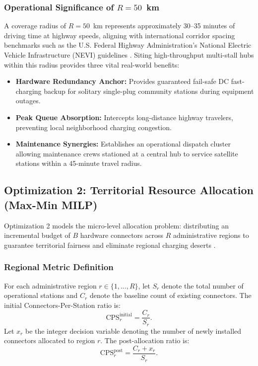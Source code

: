\documentclass[conference]{IEEEtran}
\begin{document}
\subsubsection{Operational Significance of $R = 50$~km}
A coverage radius of $R = 50$~km represents approximately 30--35 minutes of driving time at highway speeds, aligning with international corridor spacing benchmarks such as the U.S. Federal Highway Administration's National Electric Vehicle Infrastructure (NEVI) guidelines \cite{fhwa2022nevi}. Siting high-throughput multi-stall hubs within this radius provides three vital real-world benefits:
\begin{itemize}
    \item \textbf{Hardware Redundancy Anchor:} Provides guaranteed fail-safe DC fast-charging backup for solitary single-plug community stations during equipment outages.
    \item \textbf{Peak Queue Absorption:} Intercepts long-distance highway travelers, preventing local neighborhood charging congestion.
    \item \textbf{Maintenance Synergies:} Establishes an operational dispatch cluster allowing maintenance crews stationed at a central hub to service satellite stations within a 45-minute travel radius.
\end{itemize}

\subsection{Optimization 2: Territorial Resource Allocation (Max-Min MILP)}
Optimization 2 models the micro-level allocation problem: distributing an incremental budget of $B$ hardware connectors across $R$ administrative regions to guarantee territorial fairness and eliminate regional charging deserts \cite{ogryczak2014fair}.

\subsubsection{Regional Metric Definition}
For each administrative region $r \in \{1, \dots, R\}$, let $S_r$ denote the total number of operational stations and $C_r$ denote the baseline count of existing connectors. The initial Connectors-Per-Station ratio is:
\begin{equation}
\text{CPS}_r^{\text{initial}} = \frac{C_r}{S_r}.
\end{equation}
Let $x_r$ be the integer decision variable denoting the number of newly installed connectors allocated to region $r$. The post-allocation ratio is:
\begin{equation}
\text{CPS}_r^{\text{post}} = \frac{C_r + x_r}{S_r}.
\end{equation}
\end{document}
